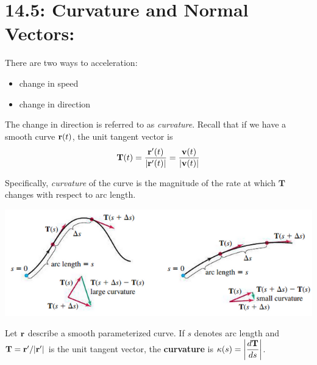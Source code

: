 \documentclass[mathNotesPreamble]{subfiles}
\begin{document}
\section{14.5: Curvature and Normal Vectors:}

  There are two ways to acceleration:
  \begin{itemize}
    \item 
      change in speed
    \item 
      change in direction
  \end{itemize}
  The change in direction is referred to as \textit{curvature}. Recall that if we have a smooth curve ${\mathbf{r}}(t)$, the unit tangent vector is
    \[\mathbf T(t)=\frac{{\mathbf{r}}'(t)}{{\left\vert{\mathbf{r}}'(t)\right\vert}}=\frac{{\mathbf{v}}(t)}{{\left\vert{\mathbf{v}}(t)\right\vert}}\]

  Specifically, \textit{curvature} of the curve is the magnitude of the rate at which $\mathbf T$ changes with respect to arc length.

  \begin{center}
    \includegraphics[width=0.8\linewidth]{images/briggs_14_05/fig14_29}
  \end{center}

  \begin{defn*}[Curvature]
    Let ${\mathbf{r}}$ describe a smooth parameterized curve. If $s$ denotes arc length and $\mathbf T={\mathbf{r}}'/{\left\vert{\mathbf{r}}'\right\vert}$ is the unit tangent vector, the \textbf{curvature} is $\displaystyle\kappa(s)={\left\vert\frac{d\mathbf T}{ds}\right\vert}$.
  \end{defn*}
  \pagebreak

  

  \noindent
\end{document}
